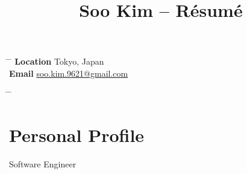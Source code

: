 \documentclass[10pt]{article} %
\begin{document}

\title{Soo Kim -- Résumé} %


\parbox[c][3em][c]{0.5\textwidth}{ %
\begin{tabbing} %
\hspace{4cm} \= \hspace{4cm} \= \kill %
\textbf{Location} \> Tokyo, Japan\\ %
\textbf{Email} \> \href{mailto:soo.kim.9621@gmail.com}{soo.kim.9621@gmail.com}\\ %
\end{tabbing}
}
\hfill %
\parbox[c][3em][c]{0.5\textwidth}{ %
\begin{tabbing} %
\hspace{4cm} \= \hspace{4cm} \= \kill %
\\
\end{tabbing}}


\section{Personal Profile}

Software Engineer


\end{document}
